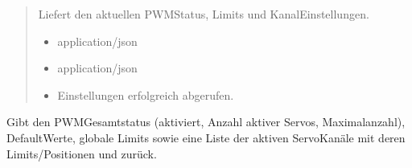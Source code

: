 \documentclass[letterpaper,10pt,english]{sphinxmanual}
\begin{document}
\begin{fulllineitems}
\label{\detokenize{agv_rest_api_pwm:get--api-agv-pwm-settings}}
\pysigstartsignatures
\pysigline
{}
\pysigstopsignatures\begin{quote}\begin{description}
\sphinxAtStartPar
Liefert den aktuellen PWM\sphinxhyphen{}Status, Limits und Kanal\sphinxhyphen{}Einstellungen.

\begin{itemize}
\item {} 
\sphinxAtStartPar
{} \textendash{} application/json

\end{itemize}

\begin{itemize}
\item {} 
\sphinxAtStartPar
{} \textendash{} application/json

\end{itemize}

\begin{itemize}
\item {} 
\sphinxAtStartPar
{} \textendash{} Einstellungen erfolgreich abgerufen.

\end{itemize}

\end{description}\end{quote}

\end{fulllineitems}


\sphinxAtStartPar
{}
Gibt den PWM\sphinxhyphen{}Gesamtstatus (aktiviert, Anzahl aktiver Servos, Maximalanzahl), Default\sphinxhyphen{}Werte, globale Limits
sowie eine Liste der aktiven Servo\sphinxhyphen{}Kanäle mit deren Limits/Positionen und  zurück.

\sphinxAtStartPar
{}
\end{document}
